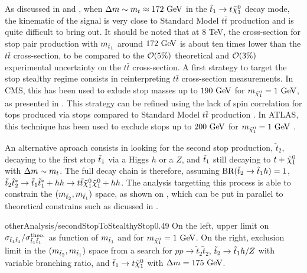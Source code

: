     As discussed in  and ,
    when $\Delta m \sim m_{t} \approx 172~\text{GeV}$ in the $\tilde{t}_1 \rightarrow t \tilde{\chi}_1^0$
    decay mode, the kinematic of the signal is very close to Standard Model $t\bar{t}$ production
    and is quite difficult to bring out. It should be noted that at 8 TeV, the cross-section
    for stop pair production with $m_{\tilde{t}_1}$ around $172~\text{GeV}$ is about ten times lower
    than the $t\bar{t}$ cross-section, to be compared to the $\mathcal{O}(5\%)$ theoretical
    and $\mathcal{O}(3\%)$ experimental uncertainty on the $t\bar{t}$ cross-section. A first
    strategy to target the stop stealthy regime consists in reinterpreting $t\bar{t}$
    cross-section measurements. In CMS, this has been used to exlude stop masses up to
    $190~\text{GeV}$ for $m_{\tilde{\chi}_1^0} = 1~\text{GeV}$, as presented in 
    \cite{topCrossSectionMeasurement}. This
    strategy can be refined using the lack of spin correlation for tops produced via
    stops compared to Standard Model $t\bar{t}$ production \cite{LightStopSigns}.
    In ATLAS, this technique has been used to exclude stops up to $200~\text{GeV}$ for
    $m_{\tilde{\chi}_1^0} = 1~\text{GeV}$ \cite{ATLASstealthyStops}.

    An alternative aproach consists in looking for the second stop production, $\tilde{t}_2$,
    decaying to the first stop $\tilde{t}_1$ via a Higgs $h$ or a $Z$, and $\tilde{t}_1$ still decaying
    to $t + \tilde{\chi}_1^0$ with $\Delta m \sim m_{t}$. The full decay chain is therefore,
    assuming $\text{BR}(\tilde{t}_2 \rightarrow \tilde{t}_1 h) = 1$,
    $\tilde{t}_2 \tilde{t}^*_2 \rightarrow \tilde{t}_1 \tilde{t}_1^* + hh \rightarrow t\bar{t} \tilde{\chi}_1^0 \tilde{\chi}_1^0 + hh$.
    The analysis targetting this process is able to constrain the $(m_{\tilde{t}_2},m_{\tilde{t}_1})$
    space, as shown on  , which
    can be put in parallel to theoretical constrains such as dicussed in .

                                {otherAnalysis/secondStopToStealthyStop}{0.49}{
                                On the left, upper limit on $\sigma_{\tilde{t}_1\tilde{t}_1} / \sigma^\text{theo.}_{\tilde{t}_1\tilde{t}_1}$
                                as function of $m_{\tilde{t}_1}$ and for $m_{\tilde{\chi}_1^0} = 1~\text{GeV}$. On the right,
                                exclusion limit in the $(m_{\tilde{t}_2},m_{\tilde{t}_1})$ space from a search for
                                $pp \rightarrow \tilde{t}_2\tilde{t}_2$, $\tilde{t}_2 \rightarrow \tilde{t}_1 h/Z$ with
                                variable branching ratio, and $\tilde{t}_1 \rightarrow t \tilde{\chi}_1^0$ with $\Delta m = 175~\text{GeV}$.}

